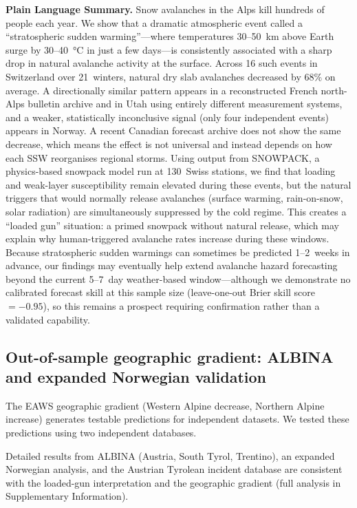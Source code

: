 \documentclass[11pt,letterpaper]{article}
\begin{document}
\noindent\textbf{Plain Language Summary.}
Snow avalanches in the Alps kill hundreds of people each year. We show that a dramatic atmospheric event called a ``stratospheric sudden warming''---where temperatures 30--50~km above Earth surge by 30--40~°C in just a few days---is consistently associated with a sharp drop in natural avalanche activity at the surface. Across 16 such events in Switzerland over 21~winters, natural dry slab avalanches decreased by 68\% on average. A directionally similar pattern appears in a reconstructed French north-Alps bulletin archive and in Utah using entirely different measurement systems, and a weaker, statistically inconclusive signal (only four independent events) appears in Norway. A recent Canadian forecast archive does not show the same decrease, which means the effect is not universal and instead depends on how each SSW reorganises regional storms. Using output from SNOWPACK, a physics-based snowpack model run at 130~Swiss stations, we find that loading and weak-layer susceptibility remain elevated during these events, but the natural triggers that would normally release avalanches (surface warming, rain-on-snow, solar radiation) are simultaneously suppressed by the cold regime. This creates a ``loaded gun'' situation: a primed snowpack without natural release, which may explain why human-triggered avalanche rates increase during these windows. Because stratospheric sudden warmings can sometimes be predicted 1--2~weeks in advance, our findings may eventually help extend avalanche hazard forecasting beyond the current 5--7~day weather-based window---although we demonstrate no calibrated forecast skill at this sample size (leave-one-out Brier skill score $= -0.95$), so this remains a prospect requiring confirmation rather than a validated capability.


\subsection*{Out-of-sample geographic gradient: ALBINA and expanded Norwegian validation}

The EAWS geographic gradient (Western Alpine decrease, Northern Alpine increase) generates testable predictions for independent datasets. We tested these predictions using two independent databases.

Detailed results from ALBINA (Austria, South Tyrol, Trentino), an expanded Norwegian analysis, and the Austrian Tyrolean incident database are consistent with the loaded-gun interpretation and the geographic gradient (full analysis in Supplementary Information).
\end{document}
